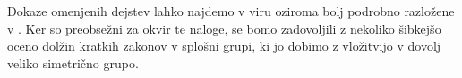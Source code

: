  Dokaze omenjenih dejstev lahko najdemo v viru \cite[str.~4--7]{Thom_2015} oziroma bolj podrobno razložene v \cite[str.~27--42]{Schneider_2016}. Ker so preobsežni za okvir te naloge, se bomo zadovoljili z nekoliko šibkejšo oceno dolžin kratkih zakonov v splošni grupi, ki jo dobimo z vložitvijo v dovolj veliko simetrično grupo.



